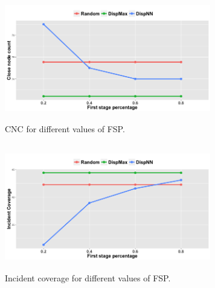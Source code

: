 \documentclass{acm_proc_article-sp}
\begin{document}
\begin{figure}[!tb]
\centering
\includegraphics[width=9cm ,height=5.5cm]{figuresPng/Uni_ClosePeople_Count.png}
\caption{CNC for different values of FSP. }
\label{fig:uniClosePeople}
\end{figure}
\begin{figure}[!tb]
\centering
\includegraphics[width=9cm ,height=5.5cm]{figuresPng/Uni-Inc_Coverage.png}
\caption{Incident coverage for different values of FSP. }
\label{fig:uniIncdCove}
\end{figure}
\end{document}
